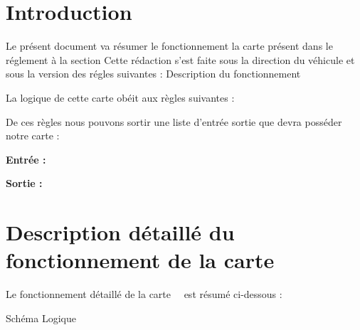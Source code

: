 \documentclass{EPSA-rap-template}
\newcommand{\TitreCarte}[1]{\renewcommand{\TitreCarte}{#1}}
\newcommand{\SectionPrimaire}[1]{\renewcommand{\SectionPrimaire}{#1}}
\newcommand{\Vehicule}[1]{\renewcommand{\Vehicule}{#1}}
\newcommand{\entree}[1]{\renewcommand{\entree}{#1}}
\newcommand{\sortie}[1]{\renewcommand{\sortie}{#1}}
\newcommand{\descDet}[1]{\renewcommand{\descDet}{#1}}
\newcommand{\verRegle}[1]{\renewcommand{\verRegle}{#1}}
\begin{document}
\fairemarges
\fairepagedegarde

\newpage

\tableofcontents

\section{Introduction}

Le présent document va résumer le fonctionnement la carte \TitreCarte \ présent dans le réglement à la section \SectionPrimaire. Cette rédaction s'est faite sous la direction du véhicule \Vehicule \ et sous la version des régles suivantes : \verRegle 

\section{Description du fonctionnement}

La logique de cette carte obéit aux règles suivantes : 

{
\scriptsize	


}

\bigskip

De ces règles nous pouvons sortir une liste d'entrée sortie que devra posséder notre carte :

\textbf{Entrée :}

\begin{itemize}

\entree

\end{itemize}

\textbf{Sortie :}

\begin{itemize}

\sortie

\end{itemize}

\section{Description détaillé du fonctionnement de la carte}

Le fonctionnement détaillé de la carte \TitreCarte \ est résumé ci-dessous : 

\descDet

\section{Schéma Logique}
\end{document}
